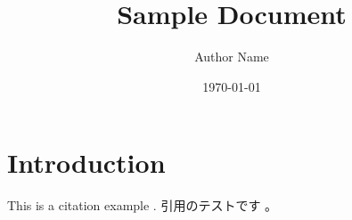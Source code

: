 \documentclass{article}
\begin{document}
\title{Sample Document}
\author{Author Name}
\date{\today}

\maketitle

\section{Introduction}
This is a citation example \cite{example1}.
引用のテストです \cite{example2}。



\end{document}
